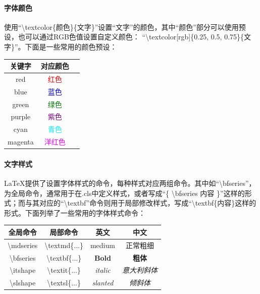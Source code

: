 \documentclass[AutoFakeBold]{ZafuThesis}
\begin{document}
\paragraph{字体颜色} 使用“\textbackslash textcolor\{颜色\}\{文字\}”设置“文字”的颜色，其中“颜色”部分可以使用预设，也可以通过RGB色值设置自定义颜色： “\textbackslash textcolor[rgb]\{0.25, 0.5, 0.75\}\{文字\}”。下面是一些常用的颜色预设：
\begin{table}[htbp]
  \centering
  \begin{tabular}{c c c}
    \toprule[1pt]
    关键字 & 对应颜色\\
    \hline
    red &  \textcolor{red}{红色} \\
    blue &  \textcolor{blue}{蓝色} \\
    green &  \textcolor{green}{绿色} \\
    purple &  \textcolor{purple}{紫色} \\
    cyan &  \textcolor{cyan}{青色} \\
    magenta &  \textcolor{magenta}{洋红色} \\


    \toprule[1pt]
  \end{tabular}
\end{table}
\paragraph{文字样式} \LaTeX 提供了设置字体样式的命令，每种样式对应两组命令。其中如“\textbackslash bfseries”，为全局命令，通常用于在.cls中定义样式，或者写成“\{ \textbackslash bfseries 内容 \}”这样的形式；而与其对应的“\textbackslash textbf”命令则用于局部修改样式，写成“\textbackslash textbf\{内容\}这样的形式。下面列举了一些常用的字体样式命令：
\begin{table}[htbp]
  \centering
  \begin{tabular}{c c c c}
    \toprule[1pt]
    全局命令 & 局部命令 & 英文 & 中文 \\
    \hline
    \textbackslash mdseries  & \textbackslash textmd\{...\} & \textmd{medium}& \textmd{正常粗细} \\
    \textbackslash bfseries  & \textbackslash textbf\{...\} & \textbf{Bold}& \textbf{粗体} \\
    \textbackslash itshape  & \textbackslash textit\{...\} & \textit{italic}& \textit{意大利斜体} \\
    \textbackslash slshape  & \textbackslash textsl\{...\} & \textsl{slanted}& \textsl{倾斜体} \\
    \toprule[1pt]
  \end{tabular}
\end{table}
\end{document}
